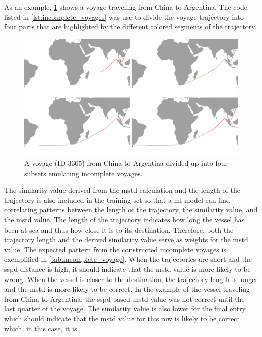 As an example, \cref{fig:incomplete_voyage} shows a voyage traveling from China to Argentina. The code listed in \cref{lst:incomplete_voyages} was use to divide the voyage trajectory into four parts that are highlighted by the different colored segments of the trajectory.

\noindent
\begin{figure}[htbp]
    \includegraphics[width=1.0\textwidth]{figures/incomplete_voyage}
    \caption{A voyage (ID 3305) from China to Argentina divided up into four subsets emulating incomplete voyages.}
    \label{fig:incomplete_voyage}
\end{figure}

The similarity value derived from the \acrshort{mstd} calculation and the length of the trajectory is also included in the training set so that a \acrshort{ml} model can find correlating patterns between the length of the trajectory, the similarity value, and the \acrshort{mstd} value. The length of the trajectory indicates how long the vessel has been at sea and thus how close it is to its destination. Therefore, both the trajectory length and the derived similarity value serve as weights for the \acrshort{mstd} value. The expected pattern from the constructed incomplete voyages is exemplified in \cref{tab:incomplete_voyage}. When the trajectories are short and the \acrshort{sspd} distance is high, it should indicate that the \acrshort{mstd} value is more likely to be wrong. When the vessel is closer to the destination, the trajectory length is longer and the \acrshort{mstd} is more likely to be correct. In the example of the vessel traveling from China to Argentina, the \acrshort{sspd}-based \acrshort{mstd} value was not correct until the last quarter of the voyage. The similarity value is also lower for the final entry which should indicate that the \acrshort{mstd} value for this row is likely to be correct which, in this case, it is.

